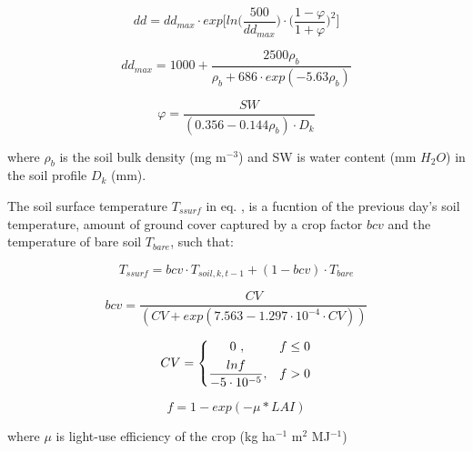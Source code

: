 \documentclass[]{article}
\begin{document}
\begin{equation}
dd = dd_{max} \cdot exp \Big[ln\Big(\frac{500}{dd_{max}} \Big) \cdot \Big(\frac{1-\varphi}{1+\varphi}\Big)^2\Big]
\label{eq:dd} 
\end{equation}

\begin{equation} 
dd_{max} = 1000 + \frac{2500\rho_b}{\rho_b+686 \cdot exp(-5.63\rho_b)}
\label{eq:ddmax} 
\end{equation}

\begin{equation} 
\varphi = \frac{SW}{(0.356-0.144\rho_b) \cdot D_{k}}
\label{eq:varphi} 
\end{equation}

where \(\rho_b\) is the soil bulk density (mg m\(^{-3}\)) and SW is
water content (mm \(H_2O\)) in the soil profile \(D_k\) (mm).

The soil surface temperature \(T_{ssurf}\) in eq. , is a
fucntion of the previous day's soil temperature, amount of ground cover
captured by a crop factor \(bcv\) and the temperature of bare soil
\(T_{bare}\), such that:

\begin{equation} 
T_{ssurf} = bcv \cdot  T_{soil, k, t-1} + (1-bcv) \cdot T_{bare}
\label{eq:Tssurf} 
\end{equation}

\begin{equation} 
bcv = \frac{CV}{(CV+exp(7.563-1.297 \cdot 10^{-4} \cdot CV))}
\label{eq:Tssurf} 
\end{equation}

\begin{equation} 
    CV = 
\begin{dcases}
     ~~~~~0~,                                     & f \leq 0 \\
    \frac{lnf}{-5\cdot10^{-5}},              & f > 0 
\end{dcases}
\end{equation}

\begin{equation} 
f=1-exp(-\mu*LAI)
\label{eq:f} 
\end{equation}

where \(\mu\) is light-use efficiency of the crop (kg ha\(^{-1}\)
m\(^2\) MJ\(^{-1}\))

\renewcommand\refname{References}

\end{document}
